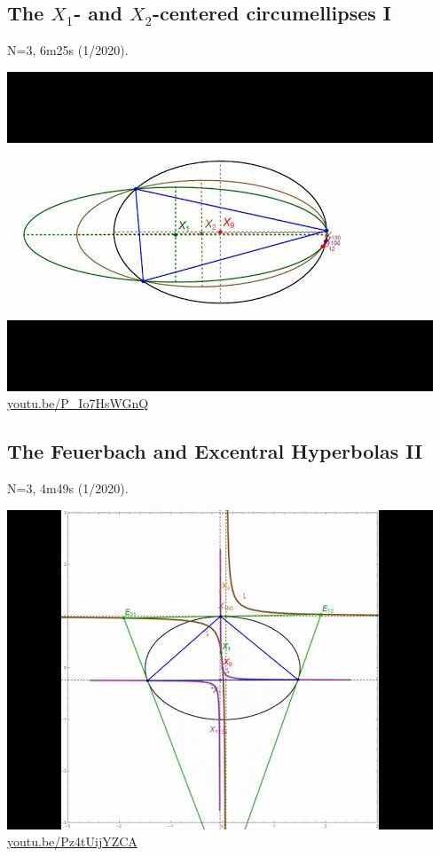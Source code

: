 \documentclass[12pt]{amsart}
\begin{document}
\subsection{The $X_{1}$- and $X_{2}$-centered circumellipses I}
\label{vid:P_Io7HsWGnQ}
\noindent N=3, 6m25s (1/2020). 
\begin{center}\includegraphics[width=.5\textwidth]{pics/P_Io7HsWGnQ.jpg} \\ 
\href{https://youtu.be/P_Io7HsWGnQ}{\url{youtu.be/P\_Io7HsWGnQ}}\end{center}
% 

\subsection{The Feuerbach and Excentral Hyperbolas II}
\label{vid:Pz4tUijYZCA}
\noindent N=3, 4m49s (1/2020). 
\begin{center}\includegraphics[width=.5\textwidth]{pics/Pz4tUijYZCA.jpg} \\ 
\href{https://youtu.be/Pz4tUijYZCA}{\url{youtu.be/Pz4tUijYZCA}}\end{center}
% 
\end{document}
